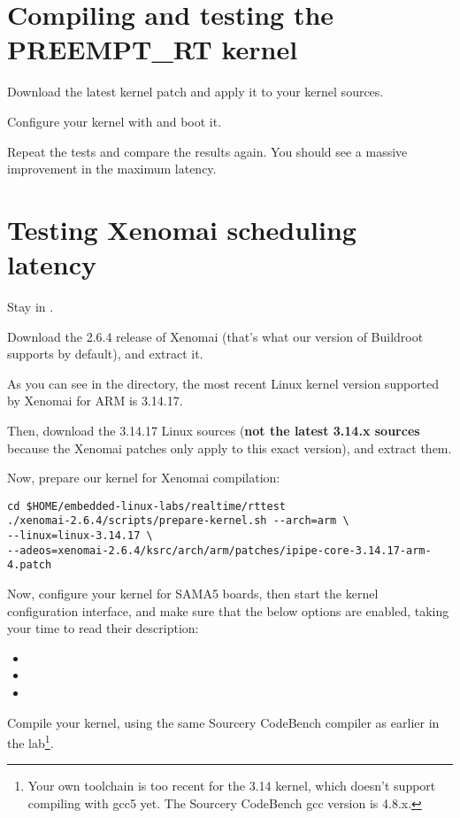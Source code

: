\section{Compiling and testing the PREEMPT\_RT kernel}

Download the latest  kernel patch and apply it to
your kernel sources.

Configure your kernel with  and boot it.

Repeat the tests and compare the results again. You should see a massive
improvement in the maximum latency.

\section{Testing Xenomai scheduling latency}

Stay in .

Download the 2.6.4 release of Xenomai (that's what our version of
Buildroot supports by default), and extract it.

As you can see in the  directory,
the most recent Linux kernel version supported by Xenomai for ARM is
3.14.17.

Then, download the 3.14.17 Linux sources ({\bf not the latest 3.14.x
sources} because the Xenomai patches only apply to this exact version),
and extract them.
 
Now, prepare our kernel for Xenomai compilation:
\begin{verbatim}
cd $HOME/embedded-linux-labs/realtime/rttest
./xenomai-2.6.4/scripts/prepare-kernel.sh --arch=arm \
--linux=linux-3.14.17 \
--adeos=xenomai-2.6.4/ksrc/arch/arm/patches/ipipe-core-3.14.17-arm-4.patch
\end{verbatim}

Now, configure your kernel for SAMA5 boards, then start the kernel
configuration interface, and make sure that the below options are
enabled, taking your time to read their description:

\begin{itemize}
\item {}
\item {}
\item {}
\end{itemize}

Compile your kernel, using the same Sourcery CodeBench compiler
as earlier in the lab\footnote{Your own toolchain is too recent
for the 3.14 kernel, which doesn't support compiling with gcc5 yet. The
Sourcery CodeBench gcc version is 4.8.x.}. 

